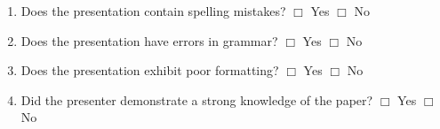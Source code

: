 \documentclass[letterpaper, 10pt]{article} %
\begin{document}
{\begin{enumerate}
\begin{itemize}
\renewcommand{\labelitemi}{$\Box$}

\setlength{\itemsep}{.5pt}

\item Introduction and motivation

\item Description of technique 

\item Technical diagrams

\item Program screenshots

\item Mathematical notation

\item Tables of data

\item Data visualizations

\item Results analysis

\item Related work 

\item Conclusion 

\item Future work 

\item Other components of a presentation

\end{itemize}

\item Does the presentation contain spelling mistakes? \hspace*{.05in}
  $\Box$ Yes \hspace*{.05in} $\Box$ No

\item Does the presentation have errors in grammar? \hspace*{.05in}
  $\Box$ Yes \hspace*{.05in} $\Box$ No

\item Does the presentation exhibit poor formatting? \hspace*{.05in}
  $\Box$ Yes \hspace*{.05in} $\Box$ No

\item Did the presenter demonstrate a strong knowledge of the
  paper? \hspace*{.05in} $\Box$ Yes \hspace*{.05in} $\Box$ No


\end{enumerate}}
\end{document}
